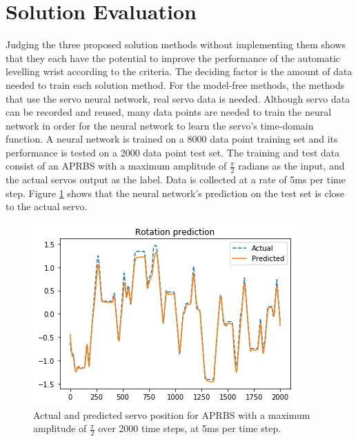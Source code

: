\documentclass[letterpaper,12pt]{article}
\begin{document}


\section{Solution Evaluation}
Judging the three proposed solution methods without implementing them shows that they each have the potential to improve the performance of the automatic levelling wrist according to the criteria. The deciding factor is the amount of data needed to train each solution method. For the model-free methods, the methods that use the servo neural network, real servo data is needed. Although servo data can be recorded and reused, many data points are needed to train the neural network in order for the neural network to learn the servo's time-domain function. A neural network is trained on a 8000 data point training set and its performance is tested on a 2000 data point test set. The training and test data consist of an APRBS with a maximum amplitude of $\frac{\pi}{2}$ radians as the input, and the actual servos output as the label. Data is collected at a rate of 5ms per time step. Figure \ref{fig:model_results_1} shows that the neural network's prediction on the test set is close to the actual servo.

\begin{figure}[H]
\centering \includegraphics[width=0.8\columnwidth]{model_results_1.png}
\caption{\label{fig:model_results_1}Actual and predicted servo position for APRBS with a maximum amplitude of $\frac{\pi}{2}$ over 2000 time steps, at 5ms per time step.}
\end{figure}
\end{document}
